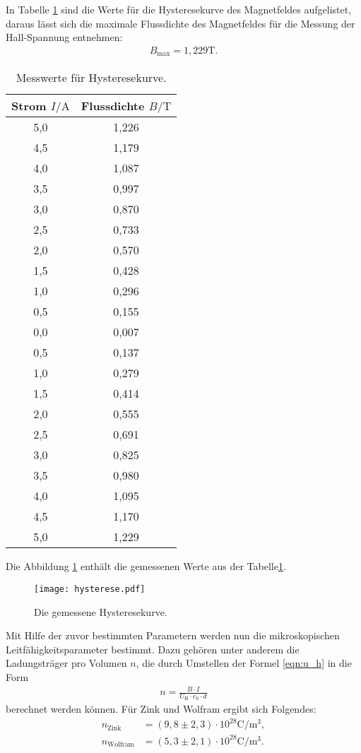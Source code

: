 In Tabelle \ref{tab:hys} sind die Werte für die Hysteresekurve des Magnetfeldes aufgelistet, daraus lässt sich die maximale Flussdichte des Magnetfeldes
für die Messung der Hall-Spannung entnehmen:
\begin{align*}
 B_\mathrm{max}=1,229\si{\tesla}.
\end{align*}
\begin{table}
  \centering
  \caption{Messwerte für Hysteresekurve.}
  \label{tab:hys}
  \begin{tabular}{c c}
    \toprule
    Strom $I/\si{\ampere}$ & Flussdichte $B/\si{\tesla}$\\
    \midrule
    5,0   &  1,226 \\
    4,5   &  1,179 \\
    4,0   &  1,087 \\
    3,5   &  0,997 \\
    3,0   &  0,870 \\
    2,5   &  0,733 \\
    2,0   &  0,570 \\
    1,5   &  0,428 \\
    1,0   &  0,296 \\
    0,5   &  0,155 \\
    0,0   &  0,007 \\
    0,5   &  0,137 \\
    1,0   &  0,279 \\
    1,5   &  0,414 \\
    2,0   &  0,555 \\
    2,5   &  0,691 \\
    3,0   &  0,825 \\
    3,5   &  0,980 \\
    4,0   &  1,095 \\
    4,5   &  1,170 \\
    5,0   &  1,229 \\
    \bottomrule
  \end{tabular}
\end{table}
\FloatBarrier
Die Abbildung \ref{fig:hys} enthält die gemessenen Werte aus der Tabelle\ref{tab:hys}.
\begin{figure}
  \centering
  \texttt{[image: hysterese.pdf]}
  \caption{Die gemessene Hysteresekurve.}
  \label{fig:hys}
\end{figure}
\FloatBarrier
Mit Hilfe der zuvor bestimmten Parametern werden nun die mikroskopischen Leitfähigkeitsparameter
bestimmt.
Dazu gehören unter anderem die Ladungsträger pro Volumen $n$, die durch Umstellen der Formel \eqref{eqn:u_h} in die Form
\begin{align}
  n=\frac{B \cdot I}{U_\mathrm{H}\cdot e_0 \cdot d}
\end{align}
berechnet werden können.
Für Zink und Wolfram ergibt sich Folgendes:
\begin{align*}
n_\mathrm{Zink}&=(9,8\pm2,3)\cdot10^{28}\si{\coulomb\per\meter\tothe{3}},\\
n_\mathrm{Wolfram}&=(5,3\pm2,1)\cdot10^{28}\si{\coulomb\per\meter\tothe{3}}.
\end{align*}

